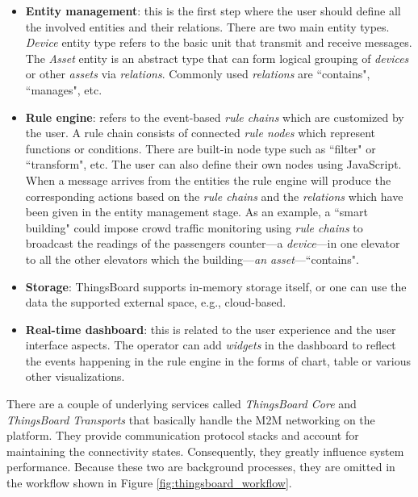 \begin{itemize}
\item \textbf{Entity management}: this is the first step where the user should define all the involved entities and their relations. There are two main entity types. \textit{Device} entity type refers to the basic unit that transmit and receive messages. The \textit{Asset} entity is an abstract type that can form logical grouping of \textit{devices} or other \textit{assets} via \textit{relations}. Commonly used \textit{relations} are ``contains", ``manages", etc.

\item \textbf{Rule engine}: refers to the event-based \textit{rule chains} which are customized by the user. A rule chain consists of connected \textit{rule nodes} which represent functions or conditions. There are built-in node type such as ``filter" or ``transform", etc. The user can also define their own nodes using JavaScript. When a message arrives from the entities the rule engine will produce the corresponding actions based on the \textit{rule chains} and the \textit{relations} which have been given in the entity management stage. As an example, a ``smart building" could impose crowd traffic monitoring using \textit{rule chains} to broadcast the readings of the passengers counter---a \textit{device}---in one elevator to all the other elevators which the building---\textit{an asset}---``contains".

\item \textbf{Storage}: ThingsBoard supports in-memory storage itself, or one can use the data the supported external space, e.g.,  cloud-based.

\item \textbf{Real-time dashboard}: this is related to the user experience and the user interface aspects. The operator can add \textit{widgets} in the dashboard to reflect the events happening in the rule engine in the forms of chart, table or various other visualizations.

\end{itemize}

There are a couple of underlying services called \textit{ThingsBoard Core} and  \textit{ThingsBoard Transports} that basically handle the M2M networking on the platform. They provide communication protocol stacks and account for maintaining the connectivity states. Consequently, they greatly influence system performance. Because these two are background processes, they are omitted in the workflow shown in Figure \ref{fig:thingsboard_workflow}.

